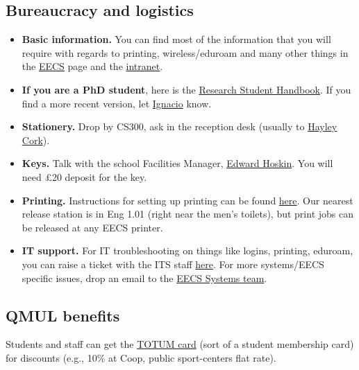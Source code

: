 \documentclass{article}
\begin{document}
\subsection{Bureaucracy and logistics}
\begin{itemize}
    \item \textbf{Basic information.} You can find most of the information that you will require with regards to printing, wireless/eduroam and many other things in the \href{http://support.eecs.qmul.ac.uk/}{EECS} page and the \href{https://intranet.eecs.qmul.ac.uk}{intranet}.
    
    \item \textbf{If you are a PhD student}, here is the \href{https://www.dropbox.com/s/o3tsluiwtqjbf9z/EECS-Research-Student-Handbook-2019-final-v5.pdf?dl=0}{Research Student Handbook}. If you find a more recent version, let \href{mailto:i.castro@qmul.ac.uk}{Ignacio} know.

    \item \textbf{Stationery.} Drop by CS300, ask in the reception desk (usually to \href{http://eecs.qmul.ac.uk/profiles/corkhayley.html}{Hayley Cork}). 

    \item \textbf{Keys.} Talk with the school Facilities Manager,  \href{http://eecs.qmul.ac.uk/profiles/hoskinsedward.html}{Edward Hoskin}. You will need £20 deposit for the key.
    
    \item \textbf{Printing.} Instructions for setting up printing can be found \href{http://support.eecs.qmul.ac.uk/services/staff-printing/#Mac}{here}. Our nearest release station is in Eng 1.01 (right near the men's toilets), but print jobs can be released at any EECS printer.
    
    \item \textbf{IT support. } For IT troubleshooting on things like logins, printing, eduroam, you can raise a ticket with the ITS staff \href{https://helpdesk.qmul.ac.uk/QMULServiceDesk.BridgeIT#/logon}{here}. For more systems/EECS specific issues, drop an email to the \href{mailto:eecs-systems@qmul.ac.uk}{EECS Systems team}.
\end{itemize}


\subsection{QMUL benefits}
Students and staff can get the \href{http://my.qmul.ac.uk/campus-and-city/deals-and-discounts/}{TOTUM card} (sort of a student membership card) for discounts (e.g., 10\% at Coop,  public sport-centers flat rate).
\end{document}
